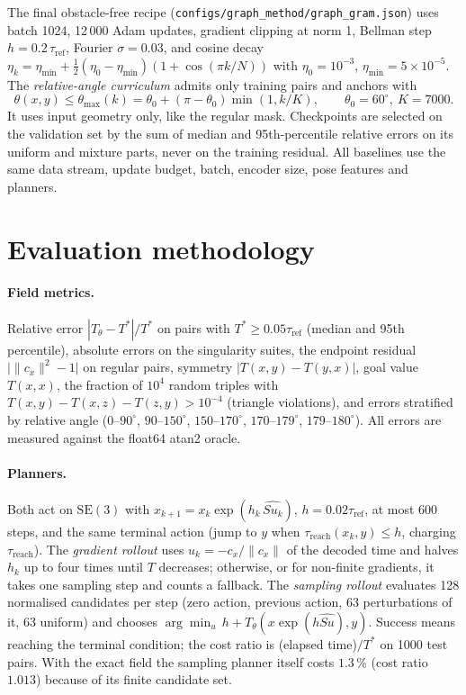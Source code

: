 \documentclass[11pt]{article}
\newcommand{\SE}{\mathrm{SE}(3)}
\newcommand{\taur}{\tau_{\mathrm{ref}}}
\newcommand{\code}[1]{\texttt{#1}}
\newcommand{\pct}{\,\%}
\begin{document}
The final obstacle-free recipe (\code{configs/graph\_method/graph\_gram.json}) uses batch 1024,
12\,000 Adam updates, gradient clipping at norm 1, Bellman step $h=0.2\,\taur$, Fourier
$\sigma=0.03$, and cosine decay
$\eta_k=\eta_{\min}+\tfrac12(\eta_0-\eta_{\min})(1+\cos(\pi k/N))$ with $\eta_0=10^{-3}$,
$\eta_{\min}=5\times10^{-5}$. The \emph{relative-angle curriculum} admits only training pairs and
anchors with
\begin{equation}
\theta(x,y)\le\theta_{\max}(k)=\theta_0+(\pi-\theta_0)\min(1,k/K),\qquad\theta_0=60^\circ,\ K=7000 .
\end{equation}
It uses input geometry only, like the regular mask. Checkpoints are selected on the validation set by
the sum of median and 95th-percentile relative errors on its uniform and mixture parts, never on the
training residual. All baselines use the same data stream, update budget, batch, encoder size, pose
features and planners.

\section{Evaluation methodology}
\label{sec:eval}

\paragraph{Field metrics.} Relative error $|T_\theta-T^*|/T^*$ on pairs with $T^*\ge0.05\taur$
(median and 95th percentile), absolute errors on the singularity suites, the endpoint residual
$\bigl|\|c_x\|^2-1\bigr|$ on regular pairs, symmetry $|T(x,y)-T(y,x)|$, goal value $T(x,x)$, the
fraction of $10^4$ random triples with $T(x,y)-T(x,z)-T(z,y)>10^{-4}$ (triangle violations), and
errors stratified by relative angle ($0$--$90^\circ$, $90$--$150^\circ$, $150$--$170^\circ$,
$170$--$179^\circ$, $179$--$180^\circ$). All errors are measured against the float64 atan2 oracle.

\paragraph{Planners.} Both act on $\SE$ with $x_{k+1}=x_k\exp(h_k\,\widehat{Su_k})$, $h=0.02\taur$,
at most 600 steps, and the same terminal action (jump to $y$ when
$\tau_{\mathrm{reach}}(x_k,y)\le h$, charging $\tau_{\mathrm{reach}}$). The \emph{gradient rollout}
uses $u_k=-c_x/\|c_x\|$ of the decoded time and halves $h_k$ up to four times until $T$ decreases;
otherwise, or for non-finite gradients, it takes one sampling step and counts a fallback. The
\emph{sampling rollout} evaluates 128 normalised candidates per step (zero action, previous action,
63 perturbations of it, 63 uniform) and chooses $\arg\min_u\,h+T_\theta(x\exp(h\widehat{Su}),y)$.
Success means reaching the terminal condition; the cost ratio is (elapsed time)$/T^*$ on 1000 test
pairs. With the exact field the sampling planner itself costs $1.3\pct$ (cost ratio
$1.013$) because of its finite candidate set.
\end{document}
